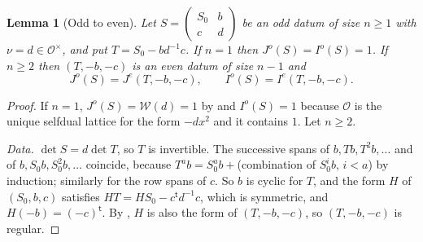 \documentclass[11pt,oneside,notitlepage]{book}
\numberwithin{equation}{section}
\theoremstyle{plain}
\newtheorem{lemma}[theorem]{Lemma}
\theoremstyle{definition}
\newcommand{\cO}{\mathcal{O}}
\newcommand{\cW}{\mathcal{W}}
\begin{document}
\begin{lemma}[Odd to even]\label{lem:odd-even}
Let $S=\left(\begin{smallmatrix}S_0&b\\c&d\end{smallmatrix}\right)$ be an odd datum of size $n\ge1$ with $\nu=d\in\cO^\times$, and put $T=S_0-bd^{-1}c$. If $n=1$ then $J^o(S)=I^o(S)=1$. If $n\ge2$ then $(T,-b,-c)$ is an even datum of size $n-1$ and
\[J^o(S)=J^e(T,-b,-c),\qquad I^o(S)=I^e(T,-b,-c).\]
\end{lemma}
\begin{proof}
If $n=1$, $J^o(S)=\cW(d)=1$ by  and $I^o(S)=1$ because $\cO$ is the unique selfdual lattice for the form $-dx^2$ and it contains $1$. Let $n\ge2$.

\emph{Data.} $\det S=d\det T$, so $T$ is invertible. The successive spans of $b,Tb,T^2b,\dots$ and of $b,S_0b,S_0^2b,\dots$ coincide, because $T^ab=S_0^ab+$(combination of $S_0^ib$, $i<a$) by induction; similarly for the row spans of $c$. So $b$ is cyclic for $T$, and the form $H$ of $(S_0,b,c)$ satisfies $HT=HS_0-c^{\mathsf t}d^{-1}c$, which is symmetric, and $H(-b)=(-c)^{\mathsf t}$. By , $H$ is also the form of $(T,-b,-c)$, so $(T,-b,-c)$ is regular.


\end{proof}
\end{document}
